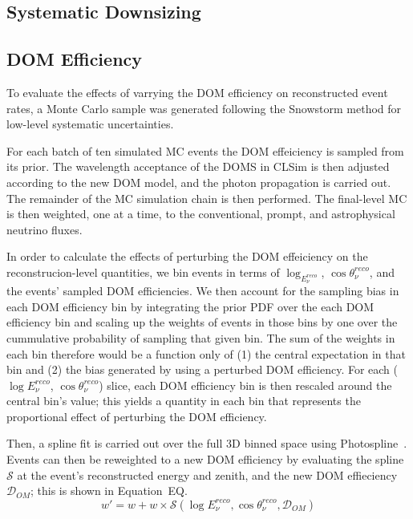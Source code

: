 \documentclass[main.tex]{subfiles}
\begin{document}
\subsection{Systematic Downsizing}

\subsection{DOM Efficiency}

To evaluate the effects of varrying the DOM efficiency on reconstructed event rates, a Monte Carlo sample was generated following the Snowstorm method for low-level systematic uncertainties.

For each batch of ten simulated MC events the DOM effeiciency is sampled from its prior. 
The wavelength acceptance of the DOMS in CLSim is then adjusted according to the new DOM model, and the photon propagation is carried out. 
The remainder of the MC simulation chain is then performed.
The final-level MC is then weighted, one at a time, to the conventional, prompt, and astrophysical neutrino fluxes. 

In order to calculate the effects of perturbing the DOM effeiciency on the reconstrucion-level quantities, we bin events in terms of $\log_{E_{\nu}^{reco}}$, $\cos\theta_{\nu}^{reco}$, and the events' sampled DOM efficiencies. 
We then account for the sampling bias in each DOM efficiency bin by integrating the prior PDF over the each DOM efficiency bin and scaling up the weights of events in those bins by one over the cummulative probability of sampling that given bin. 
The sum of the weights in each bin therefore would be a function only of (1) the central expectation in that bin and (2) the bias generated by using a perturbed DOM efficiency. 
For each ($\log E_{\nu}^{reco}$, $\cos\theta_{\nu}^{reco}$) slice, each DOM efficiency bin is then rescaled around the central bin's value; this yields a quantity in each bin that represents the proportional effect of perturbing the DOM efficiency. 

Then, a spline fit is carried out over the full 3D binned space using Photospline~\cite{WHITEHORN20132214}. 
Events can then be reweighted to a new DOM efficiency by evaluating the spline $\mathcal{S}$ at the event's reconstructed energy and zenith, and the new DOM effieciency $\mathcal{D}_{OM}$; this is shown in Equation~EQ.
\begin{equation}\label{eq:domeff}
    w' = w + w\times \mathcal{S}(\log E_{\nu}^{reco}, \cos\theta_{\nu}^{reco}, \mathcal{D}_{OM})
\end{equation}
\end{document}
